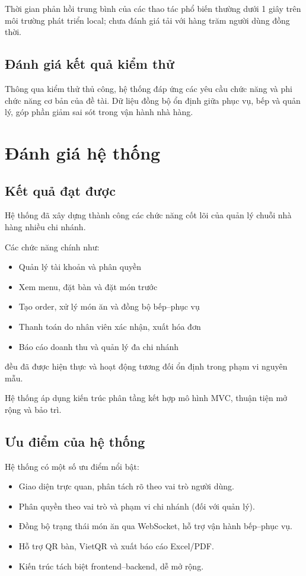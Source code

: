 \documentclass[../DoAn.tex]{subfiles}
\begin{document}
Thời gian phản hồi trung bình của các thao tác phổ biến thường dưới 1 giây trên môi trường phát triển local; chưa đánh giá tải với hàng trăm người dùng đồng thời.

\subsection{Đánh giá kết quả kiểm thử}

Thông qua kiểm thử thủ công, hệ thống đáp ứng các yêu cầu chức năng và phi chức năng cơ bản của đề tài.
Dữ liệu đồng bộ ổn định giữa phục vụ, bếp và quản lý, góp phần giảm sai sót trong vận hành nhà hàng.

\section{Đánh giá hệ thống}
\label{section:4.6}

\subsection{Kết quả đạt được}

Hệ thống đã xây dựng thành công các chức năng cốt lõi của quản lý chuỗi nhà hàng nhiều chi nhánh.

Các chức năng chính như:
\begin{itemize}
    \item Quản lý tài khoản và phân quyền
    \item Xem menu, đặt bàn và đặt món trước
    \item Tạo order, xử lý món ăn và đồng bộ bếp--phục vụ
    \item Thanh toán do nhân viên xác nhận, xuất hóa đơn
    \item Báo cáo doanh thu và quản lý đa chi nhánh
\end{itemize}

đều đã được hiện thực và hoạt động tương đối ổn định trong phạm vi nguyên mẫu.

Hệ thống áp dụng kiến trúc phân tầng kết hợp mô hình MVC, thuận tiện mở rộng và bảo trì.

\subsection{Ưu điểm của hệ thống}

Hệ thống có một số ưu điểm nổi bật:
\begin{itemize}
    \item Giao diện trực quan, phân tách rõ theo vai trò người dùng.
    \item Phân quyền theo vai trò và phạm vi chi nhánh (đối với quản lý).
    \item Đồng bộ trạng thái món ăn qua WebSocket, hỗ trợ vận hành bếp--phục vụ.
    \item Hỗ trợ QR bàn, VietQR và xuất báo cáo Excel/PDF.
    \item Kiến trúc tách biệt frontend--backend, dễ mở rộng.
\end{itemize}
\end{document}
